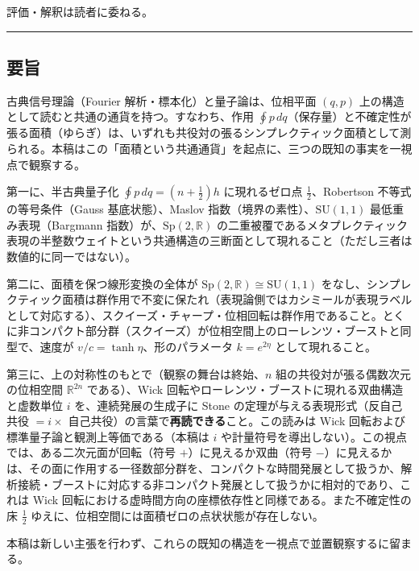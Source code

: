\documentclass[
]{ltjsarticle}
\begin{document}
評価・解釈は読者に委ねる。

\begin{center}\rule{0.5\linewidth}{0.5pt}\end{center}

\subsection{要旨}\label{ux8981ux65e8}

古典信号理論（Fourier 解析・標本化）と量子論は、位相平面 \((q,p)\)
上の構造として読むと共通の通貨を持つ。すなわち、作用
\(\oint p\,dq\)（保存量）と不確定性が張る面積（ゆらぎ）は、いずれも共役対の張るシンプレクティック面積として測られる。本稿はこの「面積という共通通貨」を起点に、三つの既知の事実を一視点で観察する。

第一に、半古典量子化 \(\oint p\,dq=(n+\tfrac12)h\) に現れるゼロ点
\(\tfrac12\)、Robertson 不等式の等号条件（Gauss 基底状態）、Maslov
指数（境界の素性）、\(\mathrm{SU}(1,1)\) 最低重み表現（Bargmann
指数）が、\(\mathrm{Sp}(2,\mathbb{R})\)
の二重被覆であるメタプレクティック表現の半整数ウェイトという共通構造の三断面として現れること（ただし三者は数値的に同一ではない）。

第二に、面積を保つ線形変換の全体が
\(\mathrm{Sp}(2,\mathbb{R})\cong\mathrm{SU}(1,1)\)
をなし、シンプレクティック面積は群作用で不変に保たれ（表現論側ではカシミールが表現ラベルとして対応する）、スクイーズ・チャープ・位相回転は群作用であること。とくに非コンパクト部分群（スクイーズ）が位相空間上のローレンツ・ブーストと同型で、速度が
\(v/c=\tanh\eta\)、形のパラメータ \(k=e^{2\eta}\) として現れること。

第三に、上の対称性のもとで（観察の舞台は終始、\(n\)
組の共役対が張る偶数次元の位相空間 \(\mathbb{R}^{2n}\) である）、Wick
回転やローレンツ・ブーストに現れる双曲構造と虚数単位 \(i\)
を、連続発展の生成子に Stone の定理が与える表現形式（反自己共役
\(=i\times\) 自己共役）の言葉で\textbf{再読できる}こと。この読みは Wick
回転および標準量子論と観測上等価である（本稿は \(i\)
や計量符号を導出しない）。この視点では、ある二次元面が回転（符号
\(+\)）に見えるか双曲（符号
\(-\)）に見えるかは、その面に作用する一径数部分群を、コンパクトな時間発展として扱うか、解析接続・ブーストに対応する非コンパクト発展として扱うかに相対的であり、これは
Wick 回転における虚時間方向の座標依存性と同様である。また不確定性の床
\(\tfrac12\) ゆえに、位相空間には面積ゼロの点状状態が存在しない。

本稿は新しい主張を行わず、これらの既知の構造を一視点で並置観察するに留まる。
\end{document}
